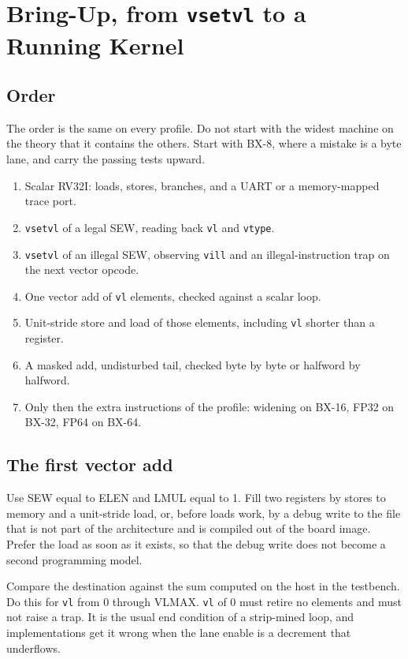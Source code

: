 \chapter{Bring-Up, from \texttt{vsetvl} to a Running Kernel}

\section{Order}

The order is the same on every profile. Do not start with the widest machine on the theory that it contains the others. Start with BX-8, where a mistake is a byte lane, and carry the passing tests upward.

\begin{enumerate}[leftmargin=1.5em]
  \item Scalar RV32I: loads, stores, branches, and a UART or a memory-mapped trace port.
  \item \texttt{vsetvl} of a legal SEW, reading back \texttt{vl} and \texttt{vtype}.
  \item \texttt{vsetvl} of an illegal SEW, observing \texttt{vill} and an illegal-instruction trap on the next vector opcode.
  \item One vector add of \texttt{vl} elements, checked against a scalar loop.
  \item Unit-stride store and load of those elements, including \texttt{vl} shorter than a register.
  \item A masked add, undisturbed tail, checked byte by byte or halfword by halfword.
  \item Only then the extra instructions of the profile: widening on BX-16, FP32 on BX-32, FP64 on BX-64.
\end{enumerate}

\section{The first vector add}

Use SEW equal to ELEN and LMUL equal to 1. Fill two registers by stores to memory and a unit-stride load, or, before loads work, by a debug write to the file that is not part of the architecture and is compiled out of the board image. Prefer the load as soon as it exists, so that the debug write does not become a second programming model.

Compare the destination against the sum computed on the host in the testbench. Do this for \texttt{vl} from 0 through VLMAX. \texttt{vl} of 0 must retire no elements and must not raise a trap. It is the usual end condition of a strip-mined loop, and implementations get it wrong when the lane enable is a decrement that underflows.

